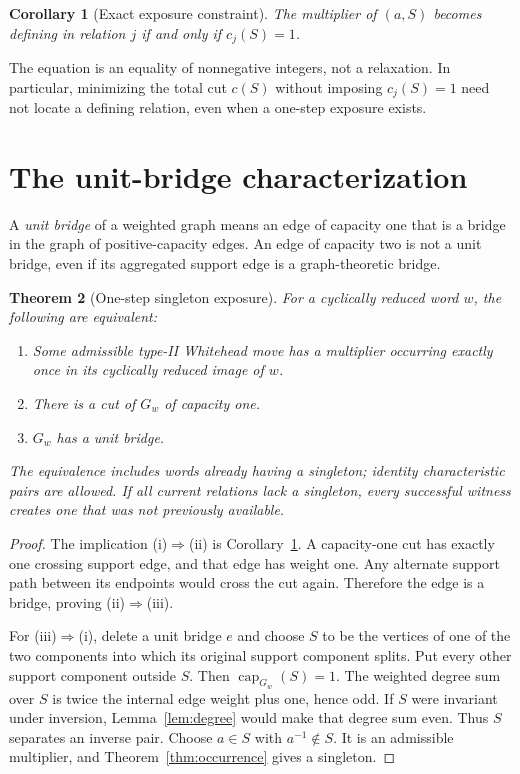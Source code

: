 \documentclass[11pt,letterpaper]{article}
\newtheorem{theorem}{Theorem}[section]
\newtheorem{corollary}[theorem]{Corollary}
\theoremstyle{definition}\newtheorem{definition}[theorem]{Definition}
\newcommand{\capc}{\operatorname{cap}}
\begin{document}
\begin{corollary}[Exact exposure constraint]\label{cor:exposure}
The multiplier of $(a,S)$ becomes defining in relation $j$ if and only if $c_j(S)=1$.
\end{corollary}
The equation is an equality of nonnegative integers, not a relaxation. In particular, minimizing the total cut $c(S)$ without imposing $c_j(S)=1$ need not locate a defining relation, even when a one-step exposure exists.

\section{The unit-bridge characterization}\label{sec:bridge}
A \emph{unit bridge} of a weighted graph means an edge of capacity one that is a bridge in the graph of positive-capacity edges. An edge of capacity two is not a unit bridge, even if its aggregated support edge is a graph-theoretic bridge.

\begin{theorem}[One-step singleton exposure]\label{thm:bridge}
For a cyclically reduced word $w$, the following are equivalent:
\begin{enumerate}[label=(\roman*)]
\item Some admissible type-II Whitehead move has a multiplier occurring exactly once in its cyclically reduced image of $w$.
\item There is a cut of $G_w$ of capacity one.
\item $G_w$ has a unit bridge.
\end{enumerate}
The equivalence includes words already having a singleton; identity characteristic pairs are allowed. If all current relations lack a singleton, every successful witness creates one that was not previously available.
\end{theorem}
\begin{proof}
The implication (i)$\Rightarrow$(ii) is Corollary~\ref{cor:exposure}. A capacity-one cut has exactly one crossing support edge, and that edge has weight one. Any alternate support path between its endpoints would cross the cut again. Therefore the edge is a bridge, proving (ii)$\Rightarrow$(iii).

For (iii)$\Rightarrow$(i), delete a unit bridge $e$ and choose $S$ to be the vertices of one of the two components into which its original support component splits. Put every other support component outside $S$. Then $\capc_{G_w}(S)=1$. The weighted degree sum over $S$ is twice the internal edge weight plus one, hence odd. If $S$ were invariant under inversion, Lemma~\ref{lem:degree} would make that degree sum even. Thus $S$ separates an inverse pair. Choose $a\in S$ with $a^{-1}\notin S$. It is an admissible multiplier, and Theorem~\ref{thm:occurrence} gives a singleton.
\end{proof}
\end{document}
